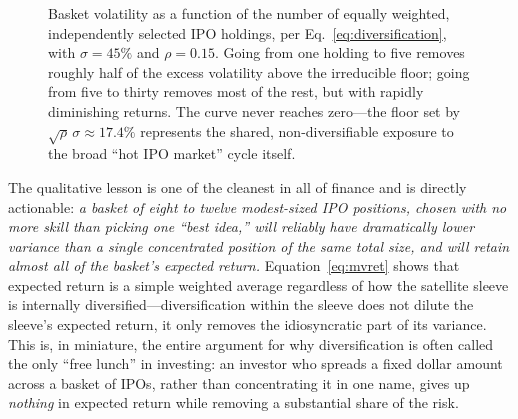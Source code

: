\documentclass[conference]{IEEEtran}
\begin{document}
\begin{figure}[!t]
\centering
{}
\caption{Basket volatility as a function of the number of equally weighted, independently selected IPO holdings, per Eq.~\eqref{eq:diversification}, with $\sigma=45\%$ and $\rho=0.15$. Going from one holding to five removes roughly half of the excess volatility above the irreducible floor; going from five to thirty removes most of the rest, but with rapidly diminishing returns. The curve never reaches zero---the floor set by $\sqrt{\rho}\,\sigma \approx 17.4\%$ represents the shared, non-diversifiable exposure to the broad ``hot IPO market'' cycle itself.}
\label{fig:diversification}
\end{figure}

The qualitative lesson is one of the cleanest in all of finance and is directly actionable: \emph{a basket of eight to twelve modest-sized IPO positions, chosen with no more skill than picking one ``best idea,'' will reliably have dramatically lower variance than a single concentrated position of the same total size, and will retain almost all of the basket's expected return.} Equation~\eqref{eq:mvret} shows that expected return is a simple weighted average regardless of how the satellite sleeve is internally diversified---diversification within the sleeve does not dilute the sleeve's expected return, it only removes the idiosyncratic part of its variance. This is, in miniature, the entire argument for why diversification is often called the only ``free lunch'' in investing: an investor who spreads a fixed dollar amount across a basket of IPOs, rather than concentrating it in one name, gives up \emph{nothing} in expected return while removing a substantial share of the risk.
\end{document}
